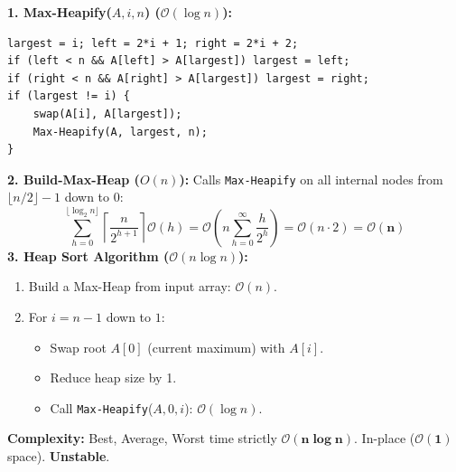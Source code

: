 \documentclass[12pt,a4paper]{article}
\begin{document}
\begin{tcolorbox}[defbox, title={\textbf{Heap Sort Procedures and Linear Build-Heap Proof}}]
\textbf{1. Max-Heapify($A, i, n$) ($\mathcal{O}(\log n)$):}
\begin{verbatim}
largest = i; left = 2*i + 1; right = 2*i + 2;
if (left < n && A[left] > A[largest]) largest = left;
if (right < n && A[right] > A[largest]) largest = right;
if (largest != i) {
    swap(A[i], A[largest]);
    Max-Heapify(A, largest, n);
}
\end{verbatim}
\par\vspace{2pt}\noindent
\textbf{2. Build-Max-Heap ($O(n)$):} Calls \texttt{Max-Heapify} on all internal nodes from $\lfloor n/2 \rfloor - 1$ down to $0$:
\begin{equation}
  \sum_{h=0}^{\lfloor \log_2 n \rfloor} \left\lceil \frac{n}{2^{h+1}} \right\rceil \mathcal{O}(h) = \mathcal{O}\left( n \sum_{h=0}^\infty \frac{h}{2^h} \right) = \mathcal{O}(n \cdot 2) = \mathbf{\mathcal{O}(n)}
\end{equation}
\textbf{3. Heap Sort Algorithm ($\mathcal{O}(n \log n)$):}
\begin{enumerate}[leftmargin=*, nosep]
  \item Build a Max-Heap from input array: $\mathcal{O}(n)$.
  \item For $i = n - 1$ down to $1$:
  \begin{itemize}[leftmargin=*, nosep]
    \item Swap root $A[0]$ (current maximum) with $A[i]$.
    \item Reduce heap size by 1.
    \item Call \texttt{Max-Heapify}($A, 0, i$): $\mathcal{O}(\log n)$.
  \end{itemize}
\end{enumerate}
\par\vspace{2pt}\noindent
\textbf{Complexity:} Best, Average, Worst time strictly $\mathbf{\mathcal{O}(n \log n)}$. In-place ($\mathbf{\mathcal{O}(1)}$ space). \textbf{Unstable}.
\end{tcolorbox}
\end{document}
